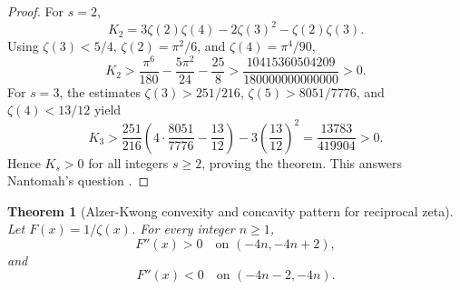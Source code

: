 \documentclass[11pt]{article}
\numberwithin{equation}{section}
\newtheorem{theorem}{Theorem}[section]
\theoremstyle{definition}
\theoremstyle{remark}
\newcommand{\1}{\mathbf 1}
\begin{document}
\begin{proof}
For \(s=2\),
\begin{equation}
\label{eq:nantomah-k2}
K_2=3\zeta(2)\zeta(4)-2\zeta(3)^2-\zeta(2)\zeta(3).
\end{equation}
Using \(\zeta(3)<5/4\), \(\zeta(2)=\pi^2/6\), and \(\zeta(4)=\pi^4/90\),
\begin{equation}
\label{eq:nantomah-k2-bound}
K_2>
\frac{\pi^6}{180}-\frac{5\pi^2}{24}-\frac{25}{8}
>
\frac{10415360504209}{180000000000000}>0.
\end{equation}
For \(s=3\), the estimates \(\zeta(3)>251/216\), \(\zeta(5)>8051/7776\), and \(\zeta(4)<13/12\) yield
\begin{equation}
\label{eq:nantomah-k3-bound}
K_3>
\frac{251}{216}
\left(4\cdot\frac{8051}{7776}-\frac{13}{12}\right)
-3\left(\frac{13}{12}\right)^2
=\frac{13783}{419904}>0.
\end{equation}
Hence \(K_s>0\) for all integers \(s\ge2\), proving the theorem.  This answers Nantomah's question \cite{nantomah}.
\end{proof}

\begin{theorem}[Alzer-Kwong convexity and concavity pattern for reciprocal zeta]
\label{thm:alzer-kwong}
Let \(F(x)=1/\zeta(x)\).  For every integer \(n\ge1\),
\begin{equation}
\label{eq:alzer-kwong-convex}
F''(x)>0\quad\text{on }(-4n,-4n+2),
\end{equation}
and
\begin{equation}
\label{eq:alzer-kwong-concave}
F''(x)<0\quad\text{on }(-4n-2,-4n).
\end{equation}
\end{theorem}
\end{document}
